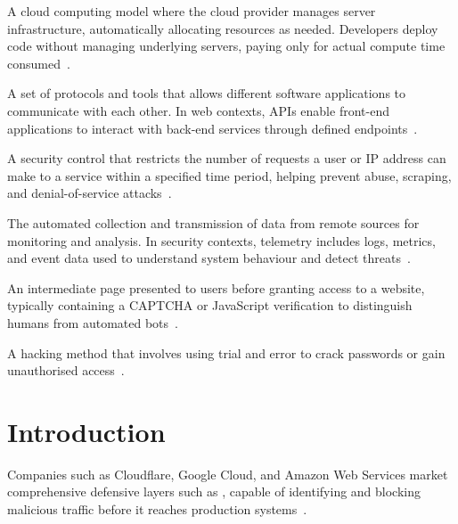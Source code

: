 \documentclass[12pt, a4paper]{report}   %
\begin{document}
\begin{description}[leftmargin=2cm, style=nextline]
  \item[Serverless Computing]
    A cloud computing model where the cloud provider manages server infrastructure,
    automatically allocating resources as needed. Developers deploy code without
    managing underlying servers, paying only for actual compute time 
    consumed~\cite{aws-lambda}.

  \item[API (Application Programming Interface)]
    A set of protocols and tools that allows different software applications to
    communicate with each other. In web contexts, APIs enable front-end applications
    to interact with back-end services through defined 
    endpoints~\cite{aws-gateway}.

  \item[Rate Limiting]
    A security control that restricts the number of requests a user or IP address can
    make to a service within a specified time period, helping prevent abuse, scraping,
    and denial-of-service attacks~\cite{cf-rate-limiting}.

  \item[Telemetry]
    The automated collection and transmission of data from remote sources for
    monitoring and analysis. In security contexts, telemetry includes logs, metrics,
    and event data used to understand system behaviour and detect 
    threats~\cite{aws-cloudwatch}.

  \item[Challenge Page]
    An intermediate page presented to users before granting access to a website,
    typically containing a CAPTCHA or JavaScript verification to distinguish humans
    from automated bots~\cite{cf-bot-fight}.

  \item[Brute Force Attack]
    A hacking method that involves using trial and error to crack passwords or gain
    unauthorised access~\cite{fortinet-brute-force}.

\end{description}

\section{Introduction}

Companies such as Cloudflare, Google Cloud, 
and Amazon Web Services market comprehensive defensive layers such as , capable 
of identifying and blocking malicious traffic before it reaches production 
systems~\cite{cf-how-works,aws-cloudfront}.
\end{document}
